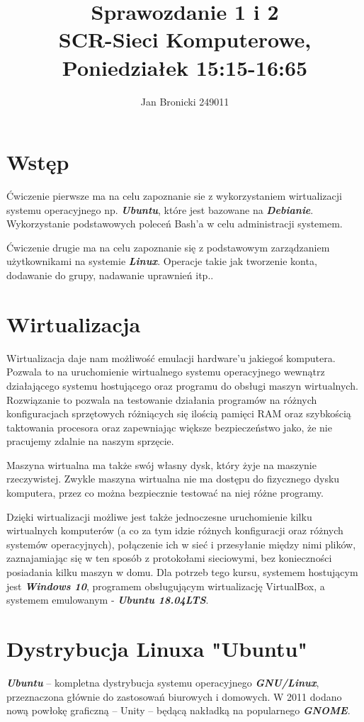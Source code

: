 \documentclass{article}
\title{
    Sprawozdanie 1 i 2\\

    \LARGE SCR-Sieci Komputerowe,\\

    Poniedziałek 15:15-16:65
}
\author{Jan Bronicki 249011 }
\date{}
\begin{document}
\maketitle


\section{Wstęp}\par
Ćwiczenie pierwsze ma na celu zapoznanie sie z wykorzystaniem wirtualizacji systemu operacyjnego np. \emph{\textbf{Ubuntu}}, które jest bazowane na \emph{\textbf{Debianie}}. Wykorzystanie podstawowych poleceń Bash'a w celu administracji systemem.\par
Ćwiczenie drugie ma na celu zapoznanie się z podstawowym zarządzaniem użytkownikami na systemie \emph{\textbf{Linux}}. Operacje takie jak tworzenie konta, dodawanie do grupy, nadawanie uprawnień itp..

\section{Wirtualizacja}
Wirtualizacja daje nam możliwość emulacji hardware'u jakiegoś komputera. Pozwala to na uruchomienie wirtualnego systemu operacyjnego wewnątrz
działającego systemu hostującego oraz programu do obsługi maszyn wirtualnych. Rozwiązanie to pozwala na testowanie działania programów na różnych
konfiguracjach sprzętowych różniących się ilością pamięci RAM oraz szybkością taktowania procesora oraz zapewniając większe bezpieczeństwo jako, że nie pracujemy zdalnie na naszym sprzęcie. \par 

Maszyna wirtualna ma także swój własny dysk, który żyje na maszynie rzeczywistej. Zwykle maszyna wirtualna nie ma dostępu do fizycznego dysku komputera, przez co można bezpiecznie testować na niej różne programy.\par

Dzięki wirtualizacji możliwe jest także jednoczesne uruchomienie kilku wirtualnych
komputerów (a co za tym idzie różnych konfiguracji oraz różnych systemów operacyjnych), połączenie ich w sieć i przesyłanie między nimi plików, zaznajamiając
się w ten sposób z protokołami sieciowymi, bez konieczności posiadania kilku maszyn
w domu. Dla potrzeb tego kursu, systemem hostującym jest \emph{\textbf{Windows 10}}, programem
obsługującym wirtualizację VirtualBox, a systemem emulowanym - \emph{\textbf{Ubuntu 18.04LTS}}.

\section{Dystrybucja Linuxa "Ubuntu"}
\emph{\textbf{Ubuntu}} – kompletna dystrybucja systemu operacyjnego \emph{\textbf{GNU/Linux}}, przeznaczona głównie do zastosowań biurowych i domowych. W 2011 dodano nową powłokę graficzną – Unity – będącą nakładką na popularnego \emph{\textbf{GNOME}}.
\end{document}
